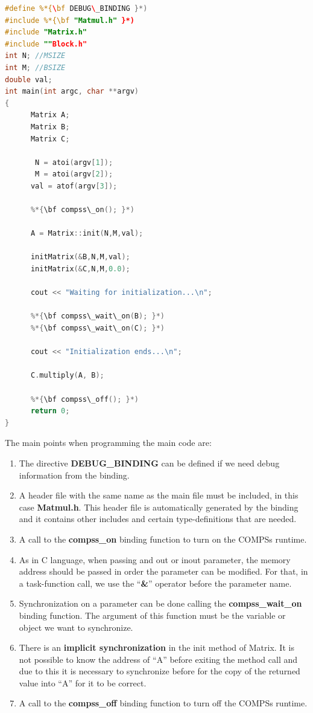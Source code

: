 \begin{lstlisting}[language=C++]
#define %*{\bf DEBUG\_BINDING }*)
#include %*{\bf "Matmul.h" }*)
#include "Matrix.h"
#include ""Block.h"
int N; //MSIZE
int M; //BSIZE
double val;
int main(int argc, char **argv)
{
      Matrix A;
      Matrix B;
      Matrix C;

       N = atoi(argv[1]);
       M = atoi(argv[2]);
      val = atof(argv[3]);

      %*{\bf compss\_on(); }*)

      A = Matrix::init(N,M,val);

      initMatrix(&B,N,M,val);
      initMatrix(&C,N,M,0.0);

      cout << "Waiting for initialization...\n";

      %*{\bf compss\_wait\_on(B); }*)
      %*{\bf compss\_wait\_on(C); }*)

      cout << "Initialization ends...\n";
 
      C.multiply(A, B);

      %*{\bf compss\_off(); }*)
      return 0;
}
\end{lstlisting}

The main points when programming the main code are:
\begin{enumerate}
 \item The directive {\bf DEBUG\_BINDING} can be defined if we need debug information from the binding.
 \item A header file with the same name as the main file must be included, in this case {\bf Matmul.h}. 
       This header file is automatically generated by the binding and it contains other includes and 
       certain type-definitions that are needed.
 \item A call to the {\bf compss\_on} binding function to turn on the COMPSs runtime.
 \item As in C language, when passing and out or inout parameter, the memory address should be passed 
       in order the parameter can be modified. For that, in a task-function call, we use the ``{\bf \&}'' 
       operator before the parameter name.
 \item Synchronization on a parameter can be done calling the {\bf compss\_wait\_on} binding function. 
       The argument of this function must be the variable or object we want to synchronize.
 \item There is an {\bf implicit synchronization} in the init method of Matrix. It is not possible to 
       know the address of ``A'' before exiting the method call and due to this it is necessary to synchronize 
       before for the copy of the returned value into ``A'' for it to be correct.
 \item A call to the {\bf compss\_off} binding function to turn off the COMPSs runtime.
\end{enumerate}


